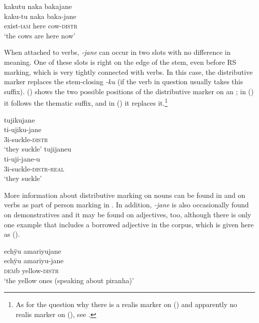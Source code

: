 \ea\label{ex:FirstDistr-2}
\begingl 
\glpreamble kakutu naka bakajane\\
\gla kaku-tu naka baka-jane\\ 
\glb exist-\textsc{iam} here cow-\textsc{distr}\\ 
\glft ‘the cows are here now’
\endgl
\trailingcitation{[mxx-n151017l-1.55]}
\xe

When attached to verbs, \textit{-jane} can occur in two slots with no difference in meaning. One of these slots is right on the edge of the stem, even before RS marking, which is very tightly connected with verbs. In this case, the distributive marker replaces the stem-closing  \textit{-ku} (if the verb in question usually takes this suffix). () shows the two possible positions of the distributive marker on an ; in () it follows the thematic suffix, and in () it replaces it.\footnote{As for the question why there is a realis marker on () and apparently no realis marker on (), see .}

\ea\label{ex:FirstDistr-1}
  \ea\label{ex:FirstDistr-1.1}
\begingl
\glpreamble tujikujane\\
\gla ti-ujiku-jane\\
\glb 3i-suckle-\textsc{distr}\\
\glft ‘they suckle’
\endgl
  \ex\label{ex:FirstDistr-1.2}
\begingl
\glpreamble tujijaneu\\
\gla ti-uji-jane-u\\
\glb 3i-suckle-\textsc{distr}-\textsc{real}\\
\glft ‘they suckle’
\endgl
\z
\xe


More information about distributive marking on nouns can be found in  and on verbs as part of person marking in . In addition, \textit{-jane} is also occasionally found on demonstratives and it may be found on adjectives, too, although there is only one example that includes a borrowed adjective in the corpus, which is given here as ().

\ea\label{ex:new23-yellow}
\begingl
\glpreamble echÿu amariyujane\\
\gla echÿu amariyu-jane\\
\glb \textsc{dem}b yellow-\textsc{distr}\\
\glft ‘the yellow ones (speaking about piranha)’
\endgl
\trailingcitation{[cux-c120414ls-2.097]}
\xe
{}

